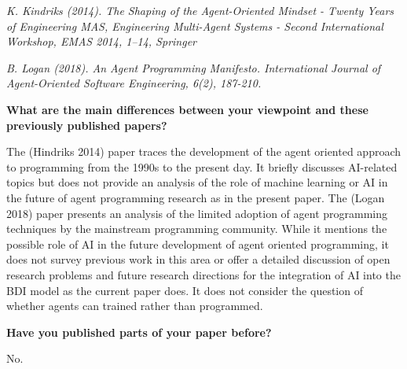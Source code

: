 \documentclass[11pt]{article}
\begin{document}
\emph{K. Kindriks (2014). The Shaping of the Agent-Oriented Mindset - Twenty Years of Engineering {MAS}, Engineering Multi-Agent Systems - Second International Workshop, {EMAS}
               2014, 1--14, Springer}

\emph{B. Logan (2018). An Agent Programming Manifesto. International Journal of Agent-Oriented Software Engineering, 6(2), 187-210.}

\medskip\noindent\textbf{What are the main differences between your viewpoint and these previously published papers?}

The (Hindriks 2014) paper traces the development of the agent oriented approach to programming from the 1990s to the present day. It briefly discusses AI-related topics but does not provide an analysis of the role of machine learning or AI in the future of agent programming research as in the present paper.
%
The (Logan 2018) paper presents an analysis of the limited adoption of agent programming techniques by the mainstream programming community. While it mentions the possible role of AI in the future development of agent oriented programming, it does not survey previous work in this area or offer a detailed discussion of open research problems and future research directions for the integration of AI into the BDI model as the current paper does. It does not consider the question of whether agents can trained rather than programmed.

\medskip\noindent\textbf{Have you published parts of your paper before?}

No.
\end{document}
